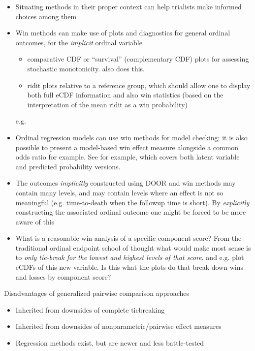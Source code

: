 \documentclass[
  11pt,
  fleqn
]{article}
\begin{document}
\begin{itemize}
  \item Situating methods in their proper context can help
    trialists make informed choices among them
  \item Win methods can make use of
    plots and diagnostics for general ordinal outcomes, for the \emph{implicit}
    ordinal variable
    \begin{itemize}
      \item comparative CDF or ``survival''
        (complementary CDF) plots for assessing stochastic
        monotonicity. \citet{follmannAnalysisOrderedComposite2020}
        also does this.
      \item ridit plots
        \citep{brossHowUseRidit1958,jansenRiditAnalysisReview1984} relative to a
        reference group, which should allow one to display both full
        eCDF information
        and also win statistics (based on the interpretation of the
          mean ridit as a win
        probability)
    \end{itemize}e.g.
  \item Ordinal regression models can use win
    methods for model checking; it is also possible to present a model-based win
    effect measure alongside a common odds ratio for example. See
    \citep{agrestiOrdinalProbabilityEffect2017} for example, which covers both
    latent variable and predicted probability versions.
  \item The outcomes
    \emph{implicitly} constructed using DOOR and win methods may contain many
    levels, and may contain levels where an effect is not so meaningful (e.g.
    time-to-death when the followup time is short). By \emph{explicitly}
    constructing the associated ordinal outcome one might be forced to be more
    aware of this
  \item What is a reasonable win analysis of a specific component
    score? From the traditional ordinal endpoint school of thought
    what would make
    most sense is to \emph{only tie-break for the lowest and highest
      levels of that
    score}, and e.g. plot eCDFs of this new variable. Is this what the plots do
    that break down wins and losses by component score?
\end{itemize}

Disadvantages of generalized pairwise comparison approaches
\begin{itemize}
  \item Inherited from downsides of complete tiebreaking
  \item Inherited from downsides of nonparametric/pairwise effect measures
  \item Regression methods exist, but are newer and less battle-tested
\end{itemize}
\end{document}
